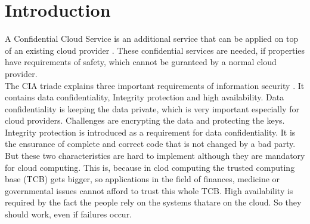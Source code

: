 \section{Introduction}
	A Confidential Cloud Service is an additional service that can be applied on top of an existing cloud provider \cite{confidentiality}. These confidential services are needed, if properties have requirements of safety, which cannot be guranteed by a normal cloud provider.   \\
	 The CIA triade explains three important requirements of information security \cite{ciaBook} \cite{cia}. It contains data confidentiality, Integrity protection and high availability. Data confidentiality is keeping the data private, which is very important especially for cloud providers. Challenges are encrypting the data and protecting the keys. Integrity protection is introduced as a requirement for data confidentiality. It is the ensurance of complete and correct code that is not changed by a bad party. But these two characteristics are hard to implement although they are mandatory for cloud computing. This is, because in clod computing the trusted computing base (TCB) gets bigger, so applications in the field of finances, medicine or governmental issues cannot afford to trust this whole TCB. High availability is required by the fact the people rely on the systems thatare on the cloud. So they should work, even if failures occur.\\
	 